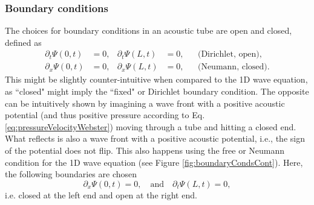 
\subsubsection{Boundary conditions}
The choices for boundary conditions in an acoustic tube are open and closed, defined as \cite{Bilbao2018}
\begin{subequations}\label{eq:contBoundariesBrass}
    \begin{align}
        \partial_t\Psi(0, t) &= 0, & \partial_t\Psi(L, t) &= 0, & &\text{(Dirichlet, open)},\label{eq:contDirichletBrass}\\
        \partial_x\Psi(0, t) &= 0, & \partial_x\Psi(L, t) &= 0, & &\text{(Neumann, closed)}\label{eq:contNeumannBrass}.
    \end{align}
\end{subequations}
This might be slightly counter-intuitive when compared to the 1D wave equation, as ``closed" might imply the ``fixed" or Dirichlet boundary condition. The opposite can be intuitively shown by imagining a wave front with a positive acoustic potential (and thus positive pressure according to Eq. \eqref{eq:pressureVelocityWebster}) moving through a tube and hitting a closed end. What reflects is also a wave front with a positive acoustic potential, i.e., the sign of the potential does not flip. This also happens using the free or Neumann condition for the 1D wave equation (see Figure \ref{fig:boundaryCondsCont}).
Here, the following boundaries are chosen
\begin{equation}\label{eq:openClosed}
    \partial_x\Psi(0, t) = 0, \quad \text{and} \quad \partial_t\Psi(L, t) = 0,
\end{equation}
i.e. closed at the left end and open at the right end.

